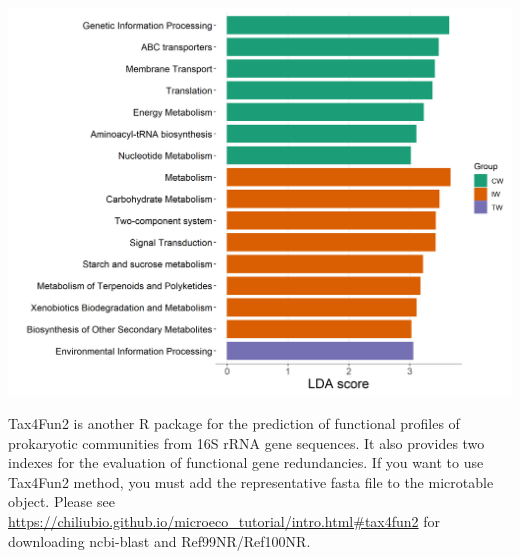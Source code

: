 \documentclass[
]{book}
\begin{document}
\begin{center}\includegraphics[width=600px]{Images/plot_lefse_bar_tax4fun} \end{center}

Tax4Fun2 \citep{Wemheuer_Tax4Fun2_2020} is another R package for the prediction of functional profiles of prokaryotic communities from 16S rRNA gene sequences.
It also provides two indexes for the evaluation of functional gene redundancies.
If you want to use Tax4Fun2 method, you must add the representative fasta file to the microtable object.
Please see \url{https://chiliubio.github.io/microeco_tutorial/intro.html\#tax4fun2} for downloading ncbi-blast and Ref99NR/Ref100NR.
\end{document}
